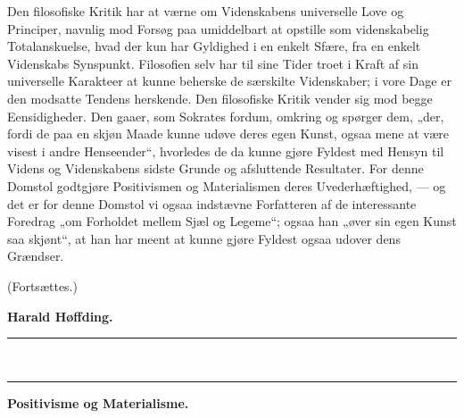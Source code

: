 \documentclass[12pt,a4paper,openany]{book}
\newcommand{\opage}[1]{\marginnote{\footnotesize\textit{[#1]}}}
\begin{document}
Den filosofiske Kritik har at værne om Videnskabens
universelle Love og Principer, navnlig mod Forsøg paa
umiddelbart at opstille som videnskabelig Totalanskuelse, hvad
der kun har Gyldighed i en enkelt Sfære, fra en enkelt
Videnskabs Synspunkt. Filosofien selv har til sine Tider
troet i Kraft af sin universelle Karakteer at kunne beherske
de særskilte Videnskaber; i vore Dage er den modsatte Tendens
herskende. Den filosofiske Kritik vender sig mod begge
Eensidigheder. Den gaaer, som Sokrates fordum, omkring
og spørger dem, „der, fordi de paa en skjøn Maade kunne
udøve deres egen Kunst, ogsaa mene at være visest i andre
Henseender“, hvorledes de da kunne gjøre Fyldest med Hensyn
til Videns og Videnskabens sidste Grunde og afsluttende
Resultater. For denne Domstol godtgjøre Positivismen og
Materialismen deres Uvederhæftighed, --- og det er for denne
Domstol vi ogsaa indstævne Forfatteren af de interessante
Foredrag „om Forholdet mellem Sjæl og Legeme“; ogsaa
han „øver sin egen Kunst saa skjønt“, at han har meent at
kunne gjøre Fyldest ogsaa udover dens Grændser.

\noindent\hspace*{1.5em}(Fortsættes.)\par
\begin{flushright}\textbf{Harald Høffding.}\end{flushright}
\begin{center}\rule{2.2cm}{0.4pt}\\[-10pt]\rule{2.2cm}{0.4pt}\end{center}

\clearpage
\opage{309}\begin{center}\textbf{\large Positivisme og Materialisme.}\end{center}
\end{document}
